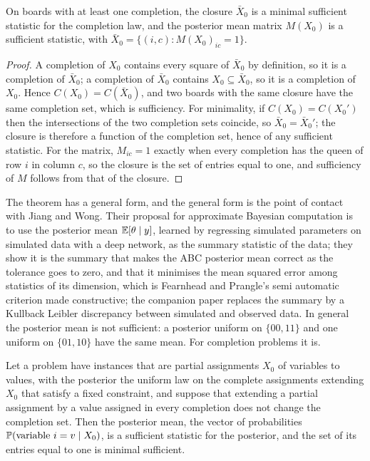 \begin{theorem}
\label{thm:closure}
On boards with at least one completion, the closure $\bar X_0$ is a minimal sufficient statistic for the completion law, and the posterior mean matrix $M(X_0)$ is a sufficient statistic, with $\bar X_0 = \{ (i, c) : M(X_0)_{ic} = 1 \}$.
\end{theorem}

\begin{proof}
A completion of $X_0$ contains every square of $\bar X_0$ by definition, so it is a completion of $\bar X_0$; a completion of $\bar X_0$ contains $X_0 \subseteq \bar X_0$, so it is a completion of $X_0$. Hence $C(X_0) = C(\bar X_0)$, and two boards with the same closure have the same completion set, which is sufficiency. For minimality, if $C(X_0) = C(X_0')$ then the intersections of the two completion sets coincide, so $\bar X_0 = \bar X_0'$; the closure is therefore a function of the completion set, hence of any sufficient statistic. For the matrix, $M_{ic} = 1$ exactly when every completion has the queen of row $i$ in column $c$, so the closure is the set of entries equal to one, and sufficiency of $M$ follows from that of the closure.
\end{proof}

The theorem has a general form, and the general form is the point of contact with Jiang and Wong. Their proposal for approximate Bayesian computation is to use the posterior mean $\mathbb{E}[\theta \mid y]$, learned by regressing simulated parameters on simulated data with a deep network, as the summary statistic of the data; they show it is the summary that makes the ABC posterior mean correct as the tolerance goes to zero, and that it minimises the mean squared error among statistics of its dimension, which is Fearnhead and Prangle's \cite{FearnheadPrangle} semi automatic criterion made constructive; the companion paper \cite{JiangWong2018} replaces the summary by a Kullback Leibler discrepancy between simulated and observed data. In general the posterior mean is not sufficient: a posterior uniform on $\{00, 11\}$ and one uniform on $\{01, 10\}$ have the same mean. For completion problems it is.

\begin{theorem}
\label{thm:pmean}
Let a problem have instances that are partial assignments $X_0$ of variables to values, with the posterior the uniform law on the complete assignments extending $X_0$ that satisfy a fixed constraint, and suppose that extending a partial assignment by a value assigned in every completion does not change the completion set. Then the posterior mean, the vector of probabilities $\mathbb{P}(\text{variable } i = v \mid X_0)$, is a sufficient statistic for the posterior, and the set of its entries equal to one is minimal sufficient.
\end{theorem}

